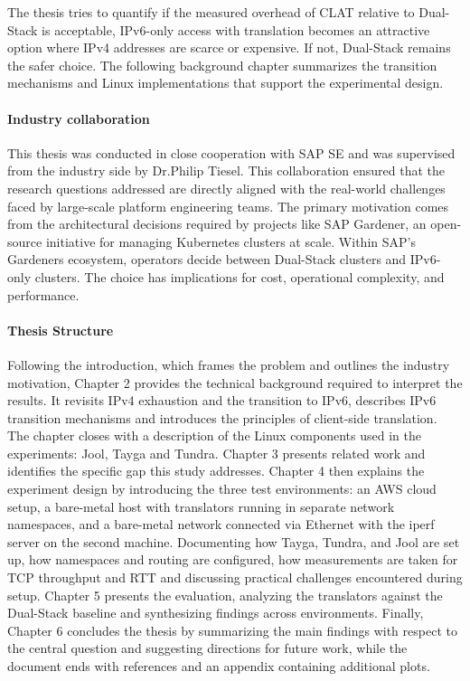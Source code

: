 The thesis tries to quantify if the measured overhead of CLAT relative to Dual-Stack is acceptable, IPv6-only access with translation becomes an attractive option where IPv4 addresses are scarce or expensive. If not, Dual-Stack remains the safer choice. The following background chapter summarizes the transition mechanisms and Linux implementations that support the experimental design\cite{rfc6877, rfc4241}.

\paragraph{Industry collaboration }
This thesis was conducted in close cooperation with SAP SE and was supervised from the industry side by Dr.Philip Tiesel. This collaboration ensured that the research questions addressed are directly aligned with the real-world challenges faced by large-scale platform engineering teams. The primary motivation comes from the architectural decisions required by projects like SAP Gardener, an open-source initiative for managing Kubernetes clusters at scale\cite{gardener_docs}. Within SAP's Gardeners ecosystem, operators decide between Dual-Stack clusters and IPv6-only clusters. The choice has implications for cost, operational complexity, and performance. 



\paragraph{Thesis Structure}
Following the introduction, which frames the problem and outlines the industry motivation, 
Chapter 2 provides the technical background required to interpret the results. It revisits IPv4 exhaustion and the transition to IPv6, 
describes IPv6 transition mechanisms and introduces the principles of client-side translation. 
The chapter closes with a description of the Linux components used in the experiments: Jool, Tayga and Tundra. Chapter 3 presents 
related work and identifies the specific gap this study addresses. 
Chapter 4 then explains the experiment design by introducing the three test environments: an AWS cloud setup, 
a bare-metal host with translators running in separate network namespaces, and 
a bare-metal network connected via Ethernet with the iperf server on the second machine. Documenting how Tayga, Tundra, and Jool are set up, 
how namespaces and routing are configured, how measurements are taken for TCP throughput and RTT and discussing practical 
challenges encountered during setup. 
Chapter 5 presents the evaluation, analyzing the translators against the 
Dual-Stack baseline and synthesizing findings across environments. Finally, Chapter 6 
concludes the thesis by summarizing the main findings with respect to the central question and 
suggesting directions for future work, while the document ends with references and an appendix containing additional plots.
